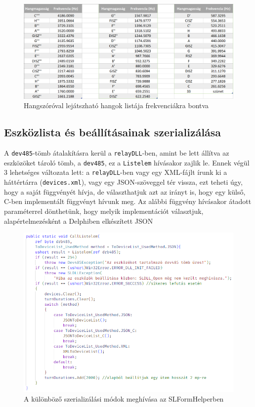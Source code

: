 \documentclass[tocnopagenum]{thesis-ekf}
\begin{document}
	\begin{figure}[H]
		\centering
		\includegraphics[scale=0.65]{frequencies}
		\caption{Hangszóróval lejátszható hangok listája frekvenciákra bontva}
		\label{fig:frequencies}
	\end{figure}
	
	\subsection{Eszközlista és beállításainak szerializálása}
		A \verb*|dev485|-tömb átalakításra kerül a \verb*|relayDLL|-ben, amint be lett állítva az eszközöket tároló tömb, a \verb*|dev485|, ez a \verb*|Listelem| hívásakor zajlik le. Ennek végül 3 lehetséges változata lett: a \verb*|relayDLL|-ben vagy egy XML-fájlt írunk ki a háttértárra (\verb*|devices.xml|), vagy egy JSON-szöveggel tér vissza, ezt teheti úgy, hogy a saját függvényét hívja, de választhatjuk azt az irányt is, hogy egy külső, C-ben implementált függvényt hívunk meg. 
		Az alábbi függvény hívásakor átadott paraméterrel dönthetünk, hogy melyik implementációt választjuk, alapértelmezésként a Delphiben elkészített JSON
		
		\begin{figure}[H]
			\centering
			\includegraphics[scale=0.65]{images/listelem_csharp.PNG}
			\caption{A különböző szerializálási módok meghívása az SLFormHelperben}
			\label{fig:listelem_csharp}
		\end{figure}
	
\end{document}

